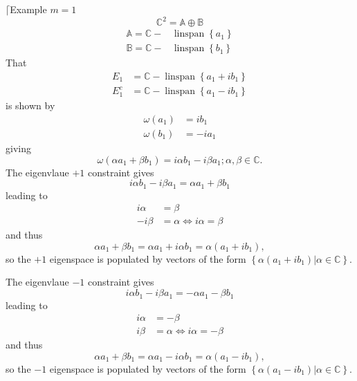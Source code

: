\documentclass[aps,preprint]{revtex4}%
\begin{document}
$\lceil$Example $m=1$%
\begin{equation}
\mathbb{C}^{2}=\mathbb{A\oplus B}%
\end{equation}%
\begin{align}
\mathbb{A}=\mathbb{C-}  &  \operatorname*{linspan}\left\{  a_{1}\right\} \\
\mathbb{B}=\mathbb{C-}  &  \operatorname*{linspan}\left\{  b_{1}\right\}
\end{align}
That
\begin{align}
E_{1}  &  =\mathbb{C-}\operatorname*{linspan}\left\{  a_{1}+ib_{1}\right\} \\
E_{1}^{c}  &  =\mathbb{C-}\operatorname*{linspan}\left\{  a_{1}-ib_{1}%
\right\}
\end{align}
is shown by
\begin{align}
\omega\left(  a_{1}\right)   &  =ib_{1}\\
\omega\left(  b_{1}\right)   &  =-ia_{1}%
\end{align}
giving%
\begin{equation}
\omega\left(  \alpha a_{1}+\beta b_{1}\right)  =i\alpha b_{1}-i\beta
a_{1};\alpha,\beta\in\mathbb{C}.
\end{equation}
The eigenvlaue $+1$ constraint gives
\[
i\alpha b_{1}-i\beta a_{1}=\alpha a_{1}+\beta b_{1}%
\]
leading to
\begin{align}
i\alpha &  =\beta\\
-i\beta &  =\alpha\Leftrightarrow i\alpha=\beta
\end{align}
and thus
\begin{equation}
\alpha a_{1}+\beta b_{1}=\alpha a_{1}+i\alpha b_{1}=\alpha\left(  a_{1}%
+ib_{1}\right)  ,
\end{equation}
so the $+1$ eigenspace is populated by vectors of the form $\left\{  \left.
\alpha\left(  a_{1}+ib_{1}\right)  \right\vert \alpha\in\mathbb{C}\right\}  .$

The eigenvlaue $-1$ constraint gives
\[
i\alpha b_{1}-i\beta a_{1}=-\alpha a_{1}-\beta b_{1}%
\]
leading to
\begin{align}
i\alpha &  =-\beta\\
i\beta &  =\alpha\Leftrightarrow i\alpha=-\beta
\end{align}
and thus
\begin{equation}
\alpha a_{1}+\beta b_{1}=\alpha a_{1}-i\alpha b_{1}=\alpha\left(  a_{1}%
-ib_{1}\right)  ,
\end{equation}
so the $-1$ eigenspace is populated by vectors of the form $\left\{  \left.
\alpha\left(  a_{1}-ib_{1}\right)  \right\vert \alpha\in\mathbb{C}\right\}  .$
\end{document}
